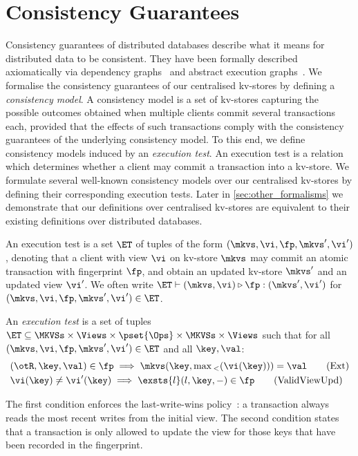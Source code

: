 \section{Consistency Guarantees}
\label{sec:cm}
Consistency guarantees of distributed databases describe
what it means for distributed data to be consistent. 
They have been formally described axiomatically via dependency graphs~\cite{adya-icde,adya}
and abstract execution graphs~\cite{ev_transactions,framework-concur}. 
We formalise the consistency guarantees of our centralised kv-stores by defining a 
\emph{consistency model}. 
A consistency model is a set of kv-stores capturing the possible outcomes 
obtained when multiple clients commit several transactions each, 
provided that the effects of such transactions comply with the consistency guarantees of the underlying consistency model. 
To this end, we define consistency models induced by an \emph{execution test}.
An execution test is a relation which determines whether a client may commit a transaction into a kv-store.  
We formulate several well-known consistency models over our centralised kv-stores 
by defining their corresponding execution tests. 
Later in \cref{sec:other_formalisms} we demonstrate that our definitions over centralised kv-stores are equivalent 
to their existing definitions over distributed databases.




An execution test is a set $\ET$ of tuples of the form $(\mkvs, \vi, \fp, \mkvs', \vi')$,
denoting that a client with view $\vi$ on kv-store $\mkvs$  may commit an atomic transaction 
with fingerprint $\fp$, and obtain an updated kv-store \( \mkvs' \) and an updated view $\vi'$. 
We often write
$\ET \vdash (\mkvs, \vi) \triangleright \fp: ( \mkvs', \vi')$ for
$(\mkvs, \vi, \fp, \mkvs', \vi') \in \ET$.


\begin{definition}
\label{def:execution.test}
An \emph{execution test} is a set of tuples $\ET \subseteq \MKVSs \times \Views \times \pset{\Ops} \times \MKVSs \times \Views$ 
such that for all $(\mkvs, \vi, \fp, \mkvs', \vi') \in \ET$ and all $\key, \val$:
%
{%
\begin{align}
\small
    & 
	(\otR, \key, \val) \in \fp \implies
	\mkvs(\key, \max{}_{<}(\vi(\key))) = \val  
	\tag{Ext} \label{eq:read-external} \\
    & 
    \vi(\key) \neq \vi'(\key) 
    \implies
    \exsts{l} (l, \key, -) \in \fp
    \tag{ValidViewUpd} \label{eq:valid-view-update}
\end{align}%
}%
\end{definition}
%
\noindent 
The first condition enforces the last-write-wins policy~\cite{vogels:2009:ec:1435417.1435432}: 
a transaction always reads the most recent writes from the initial view.  
The second condition states that a transaction is only allowed to update the view for those keys 
that have been recorded in the fingerprint.  

